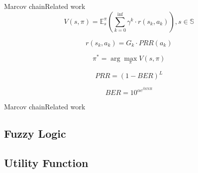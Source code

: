 \begin{frame}{Marcov chain}{Related work}
\begin{equation}
V(s, \pi)=\mathbb{E}_{s}^{\pi}\left(\sum_{k=0}^{\mathrm{inf}} \gamma^{k} \cdot r\left(s_{k}, a_{k}\right)\right), s \in \mathbb{S}
\end{equation}

\begin{equation}
r\left(s_{k}, a_{k}\right)=G_{k} \cdot P R R\left(a_{k}\right)
\end{equation}

\begin{equation}
\pi^{*}=\arg \max _{\pi} V(s, \pi)
\end{equation}


\begin{equation}
PRR=(1-BER)^{L}
\end{equation}

\begin{equation}
BER=10^{\alpha e^{\beta SNR}}
\end{equation}

\end{frame}

\begin{frame}{Marcov chain}{Related work}
\end{frame}














\subsection{Fuzzy Logic}

\subsection{Utility Function}



